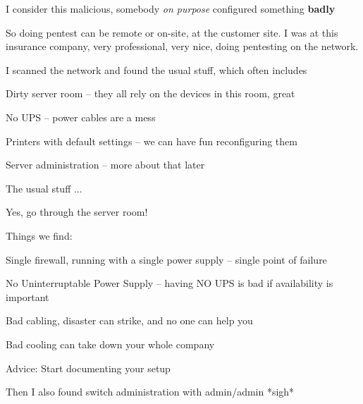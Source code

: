 \documentclass[Screen16to9,17pt]{foils}
\begin{document}
I consider this malicious, somebody \emph{on purpose} configured something {\bf badly}



So doing pentest can be remote or on-site, at the customer site. I was at this insurance company, very professional, very nice, doing pentesting on the network.

I scanned the network and found the usual stuff, which often includes
\begin{list2}
\item Dirty server room -- they all rely on the devices in this room, great
\item No UPS -- power cables are a mess
\item Printers with default settings -- we can have fun reconfiguring them
\item Server administration -- more about that later
\end{list2}

The usual stuff ...






\begin{quote}

\end{quote}

Yes, go through the server room!

Things we find:
\begin{list2}
\item Single firewall, running with a single power supply -- single point of failure
\item No Uninterruptable Power Supply -- having NO UPS is bad if availability is important
\item Bad cabling, disaster can strike, and no one can help you
\item Bad cooling can take down your whole company
\end{list2}

Advice: Start documenting your setup


Then I also found switch administration with admin/admin *sigh*
\end{document}
